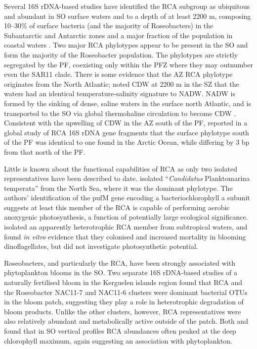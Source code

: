 Several 16S rDNA-based studies have identified the \ac{RCA} subgroup as ubiquitous and abundant in \ac{SO} surface waters and to a depth of at least 2200 m, composing \textapprox{} 10--30\% of surface bacteria (and the majority of Roseobacters) in the Subantarctic and Antarctic zones \cite{Giebel:2009hr,Murray:2007db,Ghiglione:2011ee} and a major fraction of the population in coastal waters \cite{Murray:2007db,Koh:2011ij}.
Two major \ac{RCA} phylotypes appear to be present in the \ac{SO} and form the majority of the Roseobacter population.
The phylotypes are strictly segregated by the \ac{PF}, coexisting only within the \ac{PFZ} \cite{Selje:2004ka,Giebel:2009hr} where they may outnumber even the SAR11 clade.
There is some evidence that the \ac{AZ} \ac{RCA} phylotype originates from the North Atlantic; \citet{Giebel:2009hr} noted \ac{CDW} at 2200 m in the \ac{SZ} that the waters had an identical temperature-salinity signature to \ac{NADW}.
\ac{NADW} is formed by the sinking of dense, saline waters in the surface north Atlantic, and is transported to the \ac{SO} via global thermohaline circulation to become \ac{CDW} \cite{Callahan:1972tk}.
Consistent with the upwelling of \ac{CDW} in the \ac{AZ} south of the \ac{PF}, \citep{Selje:2004ka} reported in a global study of \ac{RCA} 16S rDNA gene fragments that the surface phylotype south of the \ac{PF} was identical to one found in the Arctic Ocean, while differing by 3 bp from that north of the \ac{PF}.

Little is known about the functional capabilities of \ac{RCA} as only two isolated representatives have been described to date.
\citep{Giebel:2010bsa} isolated ``\emph{Candidatus} Planktomarina temperata'' from the North Sea, where it was the dominant phylotype.
The authors' identification of the pufM gene encoding a bacteriochlorophyll a subunit suggests at least this member of the \ac{RCA} is capable of performing aerobic anoxygenic photosynthesis, a function of potentially large ecological significance.
\citep{Mayali:2008eb} isolated an apparently heterotrophic \ac{RCA} member from subtropical waters, and found \emph{in vitro} evidence that they colonised and increased mortality in blooming dinoflagellates, but did not investigate photosynthetic potential.

Roseobacters, and particularly the \ac{RCA}, have been strongly associated with phytoplankton blooms in the \ac{SO}.
Two separate 16S rDNA-based studies of a naturally fertilised bloom in the Kerguelen islands region \cite{West:2008kc,Obernosterer:2011df} found that \ac{RCA} and the Roseobacter NAC11-7 and NAC11-6 clusters were dominant bacterial \acp{OTU} in the bloom patch, suggesting they play a role in heterotrophic degradation of bloom products.
Unlike the other clusters, however, \ac{RCA} representatives were also relatively abundant and metabolically active outside of the patch.
Both \citep{Giebel:2009hr} and \citep{Obernosterer:2011df} found that in \ac{SO} vertical profiles \ac{RCA} abundances often peaked at the deep chlorophyll maximum, again suggesting an association with phytoplankton.

